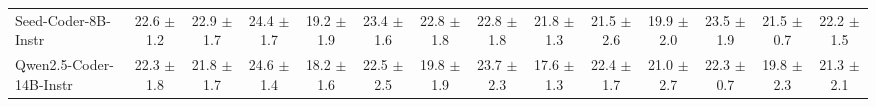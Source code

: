 \documentclass{llmxive}
\begin{document}
\begin{table}[hbt]
{\begin{tabular}{l *{13}{c}}
\rowcolor{gray!10}
Seed-Coder-8B-Instr &
22.6 {\tiny$\pm$ 1.2} &
22.9 {\tiny$\pm$ 1.7} &
24.4 {\tiny$\pm$ 1.7} &
19.2 {\tiny$\pm$ 1.9} &
23.4 {\tiny$\pm$ 1.6} &
22.8 {\tiny$\pm$ 1.8} &
22.8 {\tiny$\pm$ 1.8} &
21.8 {\tiny$\pm$ 1.3} &
21.5 {\tiny$\pm$ 2.6} &
19.9 {\tiny$\pm$ 2.0} &
23.5 {\tiny$\pm$ 1.9} &
21.5 {\tiny$\pm$ 0.7} &
22.2 {\tiny$\pm$ 1.5} \\














Qwen2.5-Coder-14B-Instr &
22.3 {\tiny$\pm$ 1.8} &
21.8 {\tiny$\pm$ 1.7} &
24.6 {\tiny$\pm$ 1.4} &
18.2 {\tiny$\pm$ 1.6} &
22.5 {\tiny$\pm$ 2.5} &
19.8 {\tiny$\pm$ 1.9} &
23.7 {\tiny$\pm$ 2.3} &
17.6 {\tiny$\pm$ 1.3} &
22.4 {\tiny$\pm$ 1.7} &
21.0 {\tiny$\pm$ 2.7} &
22.3 {\tiny$\pm$ 0.7} &
19.8 {\tiny$\pm$ 2.3} &
21.3 {\tiny$\pm$ 2.1} \\


\end{tabular}}
\end{table}
\end{document}
